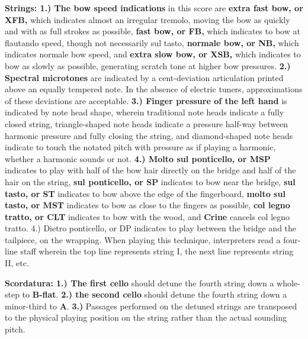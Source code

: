 \documentclass[11pt]{article}
\begin{document}
\begingroup
\textbf{Strings: 1.) The bow speed indications} in this score are \textbf{extra fast bow, or XFB,} which indicates almost an irregular tremolo, moving the bow as quickly and with as full strokes as possible,  \textbf{fast bow, or FB,} which indicates to bow at flautando speed, though not necessarily sul tasto, \textbf{normale bow, or NB,}  which indicates normale bow speed, and \textbf{extra slow bow, or XSB,} which indicates to bow as slowly as possible, generating scratch tone at higher bow pressures. \textbf{2.) Spectral microtones} are indicated by a cent-deviation articulation printed above an equally tempered note. In the absence of electric tuners, approximations of these deviations are acceptable. \textbf{3.) Finger pressure of the left hand} is indicated by note head shape, wherein traditional note heads indicate a fully closed string, triangle-shaped note heads indicate a pressure half-way between harmonic pressure and fully closing the string, and diamond-shaped note heads indicate to touch the notated pitch with pressure as if playing a harmonic, whether a harmonic sounds or not. \textbf{4.) Molto sul ponticello, or MSP} indicates to play with half of the bow hair directly on the bridge and half of the hair on the string, \textbf{sul ponticello, or SP} indicates to bow near the bridge, \textbf{sul tasto, or ST} indicates to bow above the edge of the fingerboard, \textbf{molto sul tasto, or MST} indicates to bow as close to the fingers as possible, \textbf{col legno tratto, or CLT} indicates to bow with the wood, and \textbf{Crine} cancels col legno tratto. {4.) Dietro ponticello, or DP} indicates to play between the bridge and the tailpiece, on the wrapping. When playing this technique, interpreters read a four-line staff wherein the top line represents string I, the next line represents string II, etc.
\endgroup

\begingroup
\textbf{Scordatura: 1.) The first cello} should detune the fourth string down a whole-step to \textbf{B-flat}. \textbf{2.) the second cello} should detune the fourth string down a minor-third to \textbf{A}. \textbf{3.)} Passages performed on the detuned strings are transposed to the physical playing position on the string rather than the actual sounding pitch.
\endgroup
\end{document}
